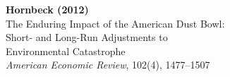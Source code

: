 \documentclass[12pt]{article}
\begin{document}
\begin{center}
{\Large\bfseries Hornbeck (2012)}\\
{\large The Enduring Impact of the American Dust Bowl:}\\
{\large Short- and Long-Run Adjustments to}\\
{\large Environmental Catastrophe}\\
\vspace{0.5em}
{\normalsize \textit{American Economic Review}, 102(4), 1477--1507}
\end{center}

\vspace{1em}




\end{document}
